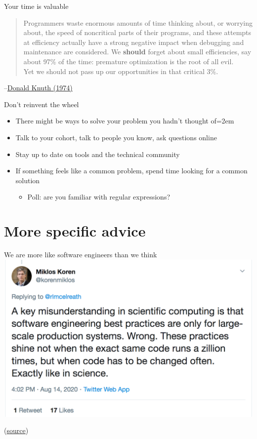 \documentclass[handout]{beamer}
\begin{document}
\begin{frame}{Your time is valuable}
\begin{quotation}
  Programmers waste enormous amounts of time thinking about, or worrying about, the speed of noncritical parts of their programs, and these attempts at efficiency actually have a strong negative impact when debugging and maintenance are considered. We \textbf{should} forget about small efficiencies, say about 97\% of the time: premature optimization is the root of all evil. \\

  Yet we should not pass up our opportunities in that critical 3\%.
\end{quotation}
--\href{https://doi.org/10.1145/356635.356640}{Donald Knuth (1974)}
\end{frame}

\begin{frame}{Don't reinvent the wheel}
    \begin{itemize}
        \item There might be ways to solve your problem you hadn't thought of\itemsep=2em
        \item Talk to your cohort, talk to people you know, ask questions online
        \item Stay up to date on tools and the technical community
        \item If something feels like a common problem, spend time looking for a common solution
        \begin{itemize}
            \item Poll: are you familiar with regular expressions?
        \end{itemize}
    \end{itemize}
\end{frame}

\section{More specific advice}

\begin{frame}{We are more like software engineers than we think}
\includegraphics[width=\textwidth]{files/tweet.pdf}

(\href{https://twitter.com/korenmiklos/status/1294363828646543362?s=20}{source})
\end{frame}
\end{document}
